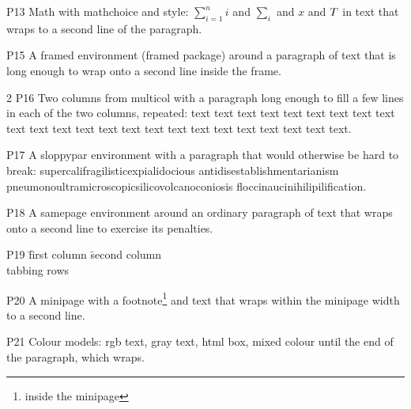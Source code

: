 \documentclass[11pt]{article}
\begin{document}
P13 Math with mathchoice and style: $\displaystyle\sum_{i=1}^n i$ and $\textstyle\sum_i$ and $\scriptstyle x$ and $\mathchoice{D}{T}{S}{SS}$ in text that wraps to a second line of the paragraph.

\begin{center}
\end{center}

\begin{framed}
P15 A framed environment (framed package) around a paragraph of text that is long enough to wrap onto a second line inside the frame.
\end{framed}

\begin{multicols}{2}
P16 Two columns from multicol with a paragraph long enough to fill a few lines in each of the two columns, repeated: text text text text text text text text text text text text text text text text text text text text text text text text.
\end{multicols}

\begin{sloppypar}
P17 A sloppypar environment with a paragraph that would otherwise be hard to break: supercalifragilisticexpialidocious antidisestablishmentarianism pneumonoultramicroscopicsilicovolcanoconiosis floccinaucinihilipilification.
\end{sloppypar}

\begin{samepage}
P18 A samepage environment around an ordinary paragraph of text that wraps onto a second line to exercise its penalties.
\end{samepage}

\begin{tabbing}
P19 \= first column \= second column \\
\> tabbing \> rows \\
\end{tabbing}

\begin{minipage}{0.6\textwidth}
P20 A minipage with a footnote\footnote{inside the minipage} and text that wraps within the minipage width to a second line.
\end{minipage}

P21 Colour models: \textcolor[rgb]{0.2,0.4,0.8}{rgb text}, \textcolor[gray]{0.5}{gray text}, \colorbox[HTML]{FFEEAA}{html box}, \color{teal!60!black}mixed colour until the end of the paragraph, which wraps.
\end{document}
